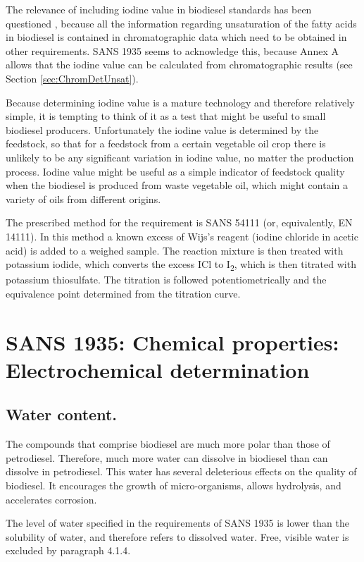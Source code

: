 The relevance of including iodine value in biodiesel standards has been
questioned \autocite{Knothe2002}, because all the information regarding
unsaturation of the fatty acids in biodiesel is contained in chromatographic
data which need to be obtained in other requirements. SANS 1935 seems to
acknowledge this, because Annex A allows that the iodine value can be calculated
from chromatographic results (see Section \ref{sec:ChromDetUnsat}).

Because determining iodine value is a mature technology and therefore relatively
simple, it is tempting to think of it as a test that might be useful to small
biodiesel producers. Unfortunately the iodine value is determined by the
feedstock, so that for a feedstock from a certain vegetable oil crop there is
unlikely to be any significant variation in iodine value, no matter the
production process. Iodine value might be useful as a simple indicator of
feedstock quality when the biodiesel is produced from waste vegetable oil, which
might contain a variety of oils from different origins.

The prescribed method for the requirement is SANS 54111 (or, equivalently, EN
14111). In this method a known excess of Wijs's reagent (iodine chloride in
acetic acid) is added to a weighed sample. The reaction mixture is then treated
with potassium iodide, which converts the excess ICl to I\textsubscript{2},
which is then titrated with potassium thiosulfate. The titration is followed
potentiometrically and the equivalence point determined from the titration
curve.

\section{SANS 1935: Chemical properties: Electrochemical determination}

\subsection{Water content.}

The compounds that comprise biodiesel are much more polar than those of
petro\-diesel. Therefore, much more water can dissolve in biodiesel than can
dissolve in petrodiesel. This water has several deleterious effects on the
quality of biodiesel. It encourages the growth of micro-organisms, allows
hydrolysis, and accelerates corrosion.

The level of water specified in the requirements of SANS 1935 is lower than the
solubility of water, and therefore refers to dissolved water. Free, visible
water is excluded by paragraph 4.1.4.

